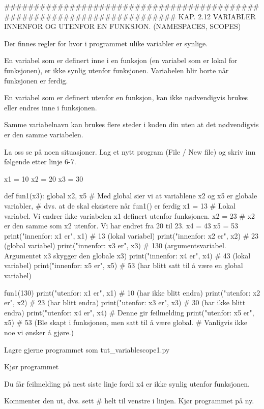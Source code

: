 ######################################################################## 
KAP. 2.12  VARIABLER INNENFOR OG UTENFOR EN FUNKSJON. 
(NAMESPACES, SCOPES)

Der finnes regler for hvor i programmet ulike variabler er synlige. 

En variabel som er definert inne i en funksjon (en variabel som er 
lokal for funksjonen), er ikke synlig utenfor funksjonen. 
Variabelen blir borte når funksjonen er ferdig. 

En variabel som er definert utenfor en funksjon, kan ikke nødvendigvis 
brukes eller endres inne i funksjonen. 

Samme variabelnavn kan brukes flere steder i koden din uten at det 
nødvendigvis er den samme variabelen.


La oss se på noen situasjoner. 
Lag et nytt program (File / New file) og skriv inn følgende etter linje 6-7.

x1 = 10
x2 = 20
x3 = 30

def fun1(x3):
    global x2, x5   # Med global sier vi at variablene x2 og x5 er globale variabler,  
                    # dvs. at de skal eksistere når fun1() er ferdig
    x1 = 13   # Lokal variabel. Vi endrer ikke variabelen x1 definert utenfor funksjonen. 
    x2 = 23   # x2 er den samme som x2 utenfor. Vi har endret fra 20 til 23. 
    x4 = 43
    x5 = 53
    print("innenfor: x1 er", x1)  #  13 (lokal variabel)
    print("innenfor: x2 er", x2)  #  23 (global variabel)
    print("innenfor: x3 er", x3)  # 130 (argumentsvariabel. Argumentet x3 skygger den globale x3)
    print("innenfor: x4 er", x4)  #  43 (lokal variabel)
    print("innenfor: x5 er", x5)  #  53 (har blitt satt til å være en global variabel)

fun1(130)
print("utenfor: x1 er", x1)   # 10 (har ikke blitt endra)
print("utenfor: x2 er", x2)   # 23 (har blitt endra)
print("utenfor: x3 er", x3)   # 30 (har ikke blitt endra)
print("utenfor: x4 er", x4)   # Denne gir feilmelding 
print("utenfor: x5 er", x5)   # 53 (Ble skapt i funksjonen, men satt til å være global. 
                              # Vanligvis ikke noe vi ønsker å gjøre.) 

Lagre gjerne programmet som tut_variablescope1.py

Kjør programmet

Du får feilmelding på nest siste linje fordi x4 er ikke synlig utenfor funksjonen. 

Kommenter den ut, dvs. sett # helt til venstre i linjen. 
Kjør programmet på ny.


